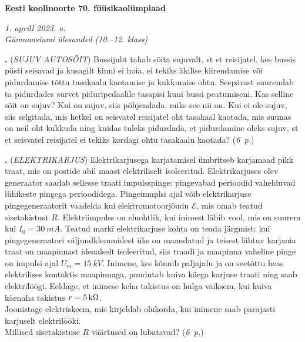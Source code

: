 \documentclass[11pt,a5paper]{article}
\newcommand{\numb}[1]{\vspace{5pt}\textbf{\large #1}}
\newcommand{\nimi}[1]{(\textsl{\small \uppercase{#1}})}
\newcommand{\punktid}[1]{(\emph{#1~p.})}
\newcounter{ylesanne}
\newcommand{\yl}[1]{\addtocounter{ylesanne}{1}\numb{\theylesanne.} \nimi{#1} \newblock{}}
\newcommand{\autor}[1]{}%
\begin{document}
\begin{center}
  \textbf{\Large Eesti koolinoorte 70. füüsikaolümpiaad} \par
  \emph{1. aprill 2023. a.\\Gümnaasiumi ülesanded (10.--12. klass)}
\end{center}

 \par

\yl{SUJUV AUTOSÕIT}
Bussijuht tahab sõita sujuvalt, st et reisijatel, kes bussis püsti seisavad ja kusagilt kinni ei hoia, ei tekiks äkilise kiirendamise või pidurdamise tõttu tasakaalu kaotamise ja kukkumise ohtu. Seepärast suurendab ta pidurdades survet piduripedaalile tasapisi kuni bussi peatumiseni. Kas selline sõit on sujuv? Kui on sujuv, siis põhjendada, miks see nii on. Kui ei ole sujuv, siis selgitada, mis hetkel on seisvatel reisijatel oht tasakaal kaotada, mis suunas on neil oht kukkuda ning kuidas tuleks pidurdada, et pidurdamine oleks sujuv, st et seisvatel reisijatel ei tekiks kordagi ohtu tasakaalu kaotada?
\punktid{6} \autor{Jaan Kalda}

\yl{ELEKTRIKARJUS}
Elektrikarjusega karjatamisel ümbritseb karjamaad pikk traat, mis on postide abil maast elektriliselt isoleeritud. Elektrikarjuses olev generaator saadab sellesse traati impulsspinge: pingevabad perioodid vahelduvad lühikeste pingega perioodidega. Pingeimuplsi ajal võib elektrikarjuse pingegeneraatorit vaadelda kui elektromotoorjõudu $\mathcal E$, mis omab teatud sisetakistust $R$. Elektriimpulss on eluohtlik, kui inimest läbib vool, mis on suurem kui $I_0=\SI{30}{mA}$. Teatud marki elektrikarjuse kohta on teada järgmist: kui pingegeneraatori väljundklemmidest üks on maandatud ja teisest lähtuv karjaaia traat on maapinnast ideaalselt isoleeritud, siis traadi ja maapinna vaheline pinge on impulsi ajal $U_m=\SI{15}{kV}$. Inimene, kes kõnnib paljajalu ja on seetõttu heas elektrilises kontaktis maapinnaga, puudutab kuiva käega karjuse traati ning saab elektrilöögi. Eeldage, et inimese keha takistus on hulga väiksem, kui kuiva käenaha takistus $r=\SI 5\kohm$.\\
\osa Joonistage elektriskeem, mis kirjeldab olukorda, kui inimene saab parajasti karjuselt elektrilööki.\\
\osa Millised sisetakistuse $R$ väärtused on lubatavad?
\punktid{6} \autor{Jaan Kalda}
\end{document}
